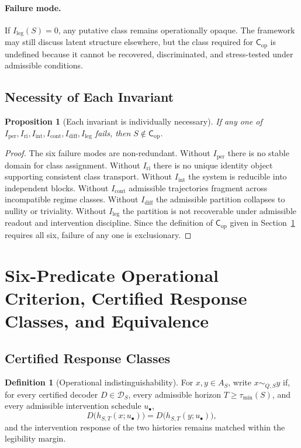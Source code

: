 \documentclass[11pt,a4paper]{article}
\newtheorem{proposition}[theorem]{Proposition}
\theoremstyle{definition}
\newtheorem{definition}[theorem]{Definition}
\newcommand{\Cop}{\mathsf{C}_{\mathrm{op}}}
\newcommand{\Iper}{I_{\mathrm{per}}}
\newcommand{\Iri}{I_{\mathrm{ri}}}
\newcommand{\Iint}{I_{\mathrm{int}}}
\newcommand{\Icont}{I_{\mathrm{cont}}}
\newcommand{\Idiff}{I_{\mathrm{diff}}}
\newcommand{\Ileg}{I_{\mathrm{leg}}}
\newcommand{\Aset}{A_S}
\newcommand{\Dec}{\mathscr{D}}
\begin{document}
\paragraph{Failure mode.}
If $\Ileg(S)=0$, any putative class remains operationally opaque. The framework may still discuss latent structure elsewhere, but the class required for $\Cop$ is undefined because it cannot be recovered, discriminated, and stress-tested under admissible conditions.

\subsection{Necessity of Each Invariant}
\begin{proposition}[Each invariant is individually necessary]\label{prop:necessity}
If any one of $\Iper,\allowbreak \Iri,\allowbreak \Iint,\allowbreak \Icont,\allowbreak \Idiff,\allowbreak \Ileg$ fails, then $S \notin \Cop$.
\end{proposition}

\begin{proof}
The six failure modes are non-redundant. Without $\Iper$ there is no stable domain for class assignment. Without $\Iri$ there is no unique identity object supporting consistent class transport. Without $\Iint$ the system is reducible into independent blocks. Without $\Icont$ admissible trajectories fragment across incompatible regime classes. Without $\Idiff$ the admissible partition collapses to nullity or triviality. Without $\Ileg$ the partition is not recoverable under admissible readout and intervention discipline. Since the definition of $\Cop$ given in Section~\ref{sec:cop} requires all six, failure of any one is exclusionary.
\end{proof}

\section{Six-Predicate Operational Criterion, Certified Response Classes, and Equivalence}\label{sec:cop}
\subsection{Certified Response Classes}

\begin{definition}[Operational indistinguishability]\label{def:indist}
For $x,y \in \Aset$, write $x \sim_{Q,S} y$ if, for every certified decoder $D \in \Dec_S$, every admissible horizon $T \ge \tau_{\min}(S)$, and every admissible intervention schedule $u_\bullet$,
\[
D\bigl(h_{S,T}(x;u_\bullet)\bigr)=D\bigl(h_{S,T}(y;u_\bullet)\bigr),
\]
and the intervention response of the two histories remains matched within the legibility margin.
\end{definition}
\end{document}
